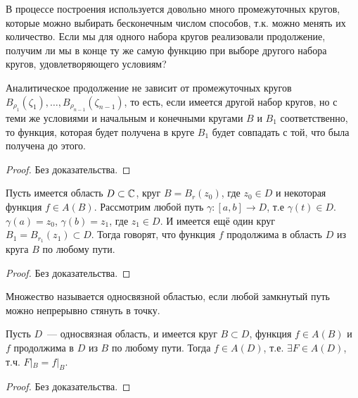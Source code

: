 \documentclass[main]{subfiles}
\begin{document}
В процессе построения используется довольно много промежуточных кругов, которые можно выбирать бесконечным числом способов, т.к. можно менять их количество.
Если мы для одного набора кругов реализовали продолжение, получим ли мы в конце ту же самую функцию при выборе другого набора кругов, удовлетворяющего условиям?

\begin{theorem}
    Аналитическое продолжение не зависит от промежуточных кругов $B_{\rho_1}(\zeta_1), \dotsc, B_{\rho_{n-1}}(\zeta_{n-1})$, то есть, если имеется другой набор кругов, но с теми же условиями и начальным и конечными кругами $B$ и $B_1$ соответственно, то функция, которая будет получена в круге $B_1$ будет совпадать с той, что была получена до этого.
\end{theorem}
\begin{proof}
    Без доказательства.
\end{proof}

\begin{theorem}
    Пусть имеется область $D \subset \mathbb{C}$, круг $B = B_r(z_0)$, где $z_0 \in D$ и некоторая функция $f \in A(B)$.
    Рассмотрим любой путь $\gamma: [a,b] \to D$, т.е $\gamma(t) \in D$.
    $\gamma(a) = z_0$, $\gamma(b) = z_1$, где $z_1 \in D$.
    И имеется ещё один круг $B_1 = B_{r_1}(z_1) \subset D$.
    Тогда говорят, что функция $f$ продолжима в область $D$ из круга $B$ по любому пути.
\end{theorem}
\begin{proof}
    Без доказательства.
\end{proof}

\begin{definition}
    Множество называется односвязной областью, если любой замкнутый путь можно непрерывно стянуть в точку.
\end{definition}
\begin{theorem}[о монодромии]
    Пусть $D$~--- односвязная область, и имеется круг $B \subset D$, функция $f \in A(B)$ и $f$ продолжима в $D$ из $B$ по любому пути.
    Тогда $f \in A(D)$, т.е. $\exists F \in A(D)$, т.ч. $F|_B = f|_B$.
\end{theorem}
\begin{proof}
    Без доказательства.
\end{proof}
\end{document}
